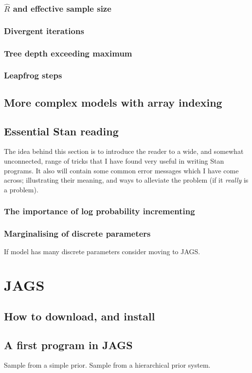 \documentclass[11pt,fullpage]{book}
\begin{document}
\subsubsection{$\hat{R}$ and effective sample size}
\subsubsection{Divergent iterations}
\subsubsection{Tree depth exceeding maximum}
\subsubsection{Leapfrog steps}

\subsection{More complex models with array indexing}

\subsection{Essential Stan reading}
The idea behind this section is to introduce the reader to a wide, and somewhat unconnected, range of tricks that I have found very useful in writing Stan programs. It also will contain some common error messages which I have come across; illustrating their meaning, and ways to alleviate the problem (if it \textit{really} is a problem).

\subsubsection{The importance of log probability incrementing}
\subsubsection{Marginalising of discrete parameters}
If model has many discrete parameters consider moving to JAGS.

\section{JAGS}
\subsection{How to download, and install}
\subsection{A first program in JAGS}
Sample from a simple prior. Sample from a hierarchical prior system.
\end{document}
